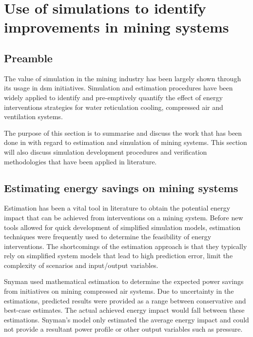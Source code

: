 \section{Use of simulations to identify improvements in mining systems}
	\subsection{Preamble}
	The value of simulation in the mining industry has been largely shown through its usage in \gls{dsm} initiatives. Simulation and estimation procedures have been widely applied to identify and pre-emptively quantify the effect of energy interventions strategies for water reticulation cooling, compressed air and ventilation systems.
	\par
	 The purpose of this section is to summarise and discuss the work that has been done in with regard to estimation and simulation of mining systems. This section will also discuss simulation development procedures and verification methodologies that have been applied in literature.
	
	\subsection{Estimating energy savings on mining systems }
	Estimation has been a vital tool in literature to obtain the potential energy impact that can be achieved from interventions on a mining system. Before new tools allowed for quick development of simplified simulation models, estimation techniques were frequently used to determine the feasibility of energy interventions. The shortcomings of the estimation approach is that they typically rely on simplified system models that lead to high prediction error, limit the complexity of scenarios and input/output variables.
		\par 
	Snyman \cite{Snyman2011Masters} used mathematical estimation to determine the expected power savings from initiatives on mining compressed air systems. Due to uncertainty in the estimations, \cite{Snyman2011Masters} predicted results were provided as a range between conservative and best-case estimates. The actual achieved energy impact would fall between these estimations. Snyman's model only estimated the average energy impact and could not provide a resultant power profile or other output variables such as pressure.
		 	
